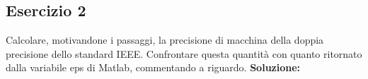 \subsection{Esercizio 2}
Calcolare, motivandone i passaggi, la precisione di macchina della doppia precisione 
dello standard IEEE. Confrontare questa quantità con quanto ritornato dalla variabile eps di
Matlab, commentando a riguardo.
\newline \textbf{Soluzione:}
